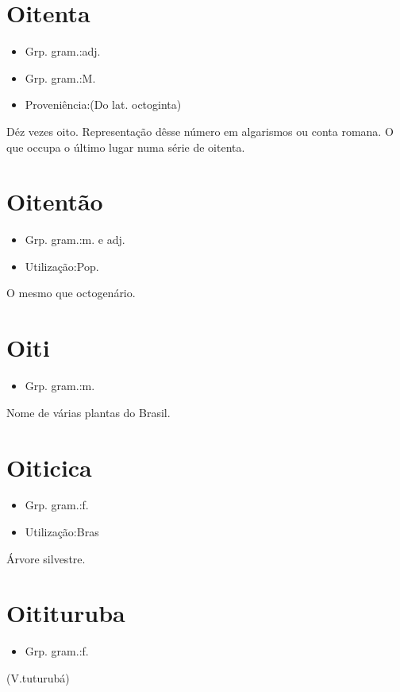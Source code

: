 \section{Oitenta}
\begin{itemize}
\item {Grp. gram.:adj.}
\end{itemize}
\begin{itemize}
\item {Grp. gram.:M.}
\end{itemize}
\begin{itemize}
\item {Proveniência:(Do lat. \textunderscore octoginta\textunderscore )}
\end{itemize}
Déz vezes oito.
Representação dêsse número em algarismos ou conta romana.
O que occupa o último lugar numa série de oitenta.
\section{Oitentão}
\begin{itemize}
\item {Grp. gram.:m.  e  adj.}
\end{itemize}
\begin{itemize}
\item {Utilização:Pop.}
\end{itemize}
O mesmo que \textunderscore octogenário\textunderscore .
\section{Oiti}
\begin{itemize}
\item {Grp. gram.:m.}
\end{itemize}
Nome de várias plantas do Brasil.
\section{Oiticica}
\begin{itemize}
\item {Grp. gram.:f.}
\end{itemize}
\begin{itemize}
\item {Utilização:Bras}
\end{itemize}
Árvore silvestre.
\section{Oitituruba}
\begin{itemize}
\item {Grp. gram.:f.}
\end{itemize}
(V.tuturubá)
